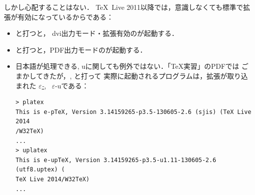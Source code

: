 \documentclass[b5paper]{bxjsarticle} %
\begin{document}
しかし心配することはない．
\TeX~Live 2011以降では，意識しなくても標準で\eTeX 拡張が有効になっているからである：
\begin{itemize}
\item {}と打つと，
  dvi出力モード・\eTeX 拡張有効の\pdfTeX が起動する．
\item {}と打つと，PDF出力モードの\pdfTeX が起動する．
\item 日本語が処理できる\pTeX, u\pTeX に関しても例外ではない．「\TeX 実習」のPDFでは
ごまかしてきたが，, と打って
実際に起動されるプログラムは，\eTeX 拡張が取り込まれた
\href{http://sourceforge.jp/projects/eptex/wiki/FrontPage}{\emph{$\varepsilon$-\pTeX}},~%
$\varepsilon$-u\pTeX である：
\begin{lstlisting}
> platex
This is e-pTeX, Version 3.14159265-p3.5-130605-2.6 (sjis) (TeX Live 2014
/W32TeX)
...
> uplatex
This is e-upTeX, Version 3.14159265-p3.5-u1.11-130605-2.6 (utf8.uptex) (
TeX Live 2014/W32TeX)
...
\end{lstlisting}
\end{itemize}




\newpage
\section{\pdfTeX}
\label{sec:pdftex}
\end{document}
